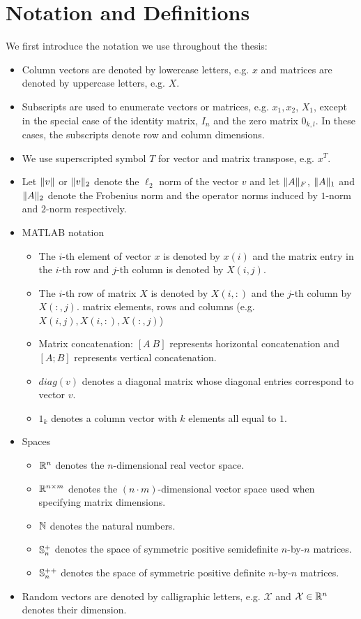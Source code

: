 %
\chapter{Notation and Definitions}\label{chap:notation}

We first introduce the notation we use throughout the thesis:
\begin{itemize}
\item Column vectors are denoted by lowercase letters, e.g. $x$ and matrices are denoted by uppercase letters, e.g. $X$.
\item Subscripts are used to enumerate vectors or matrices, e.g. $x_1, x_2$, $X_1$, except in the
special case of the identity matrix, $I_n$ and the zero matrix $0_{k,l}$. In these cases, the subscripts denote row and column dimensions.
\item We use superscripted symbol $T$ for vector and matrix transpose, e.g. $x^T$.
\item Let $\lVert v\rVert$ or $\lVert v\rVert_2$ denote the $\ell_2$ norm of the vector $v$ and let 
$\lVert A\rVert_F$, $\lVert A\rVert_1$ and $\lVert A\rVert_2$ denote the Frobenius norm and the operator norms induced by $1$-norm and $2$-norm respectively.
\item MATLAB notation~\cite{golub}
\begin{itemize}
\item The $i$-th element of vector $x$ is denoted by $x(i)$ and the matrix entry in the $i$-th row and $j$-th column is denoted by $X(i,j)$.
\item The $i$-th row of matrix $X$ is denoted by $X(i,:)$ and the $j$-th column by $X(:,j)$.
 matrix elements, rows and columns {(e.g. ${X(i,j), X(i,:), X(:,j)}$)}
\item Matrix concatenation: $[A~B]$ represents horizontal concatenation and $[A; B]$ represents vertical concatenation.
\item $diag(v)$ denotes a diagonal matrix whose diagonal entries correspond to vector $v$.
\item $1_k$ denotes a column vector with $k$ elements all equal to $1$.
\end{itemize}
\item Spaces
\begin{itemize}
 \item $\mathbb{R}^n$ denotes the $n$-dimensional real vector space.
 \item $\mathbb{R}^{n\times m}$ denotes the $(n \cdot m)$-dimensional vector space used when specifying
 matrix dimensions.
 \item $\mathbb{N}$ denotes the natural numbers.
 \item $\mathbb{S}_n^{+}$ denotes the space of symmetric positive semidefinite $n$-by-$n$ matrices.
 \item $\mathbb{S}_n^{++}$ denotes the space of symmetric positive definite $n$-by-$n$ matrices.
\end{itemize}
\item Random vectors are denoted by calligraphic letters, e.g. $\mathcal{X}$ and $\mathcal{X} \in \mathbb{R}^n$ denotes their dimension.
\end{itemize}


